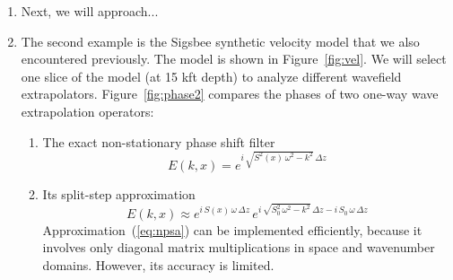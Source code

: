 \begin{enumerate}




\lstset{language=python,numbers=left,numberstyle=\tiny,showstringspaces=false}
{\small }

\item Next, we will approach...

\lstset{language=python,numbers=left,numberstyle=\tiny,showstringspaces=false}
{\small }

\lstset{language=c,numbers=left,numberstyle=\tiny,showstringspaces=false}
{\small }

\item The second example is the Sigsbee synthetic velocity model that
  we also encountered previously. The model is shown in
  Figure~\ref{fig:vel}. We will select one slice of the model (at 15
  kft depth) to analyze different wavefield
  extrapolators. Figure~\ref{fig:phase2} compares the phases of two one-way wave
  extrapolation operators:
  \begin{enumerate}
  \item The exact non-stationary phase shift filter
    \begin{equation}
      \label{eq:nps}
      E(k,x) = e^{i\,\sqrt{S^2(x)\,\omega^2 - k^2}\,\Delta z}
    \end{equation}
  \item Its split-step approximation
    \begin{equation}
      \label{eq:npsa}
      E(k,x) \approx e^{i\,S(x)\,\omega\,\Delta z}\,e^{i\,\sqrt{S_0^2\,\omega^2 - k^2}\,\Delta z-i\,S_0\,\omega\,\Delta z}
    \end{equation}
    Approximation~(\ref{eq:npsa}) can be implemented efficiently, because it involves
    only diagonal matrix multiplications in space and wavenumber domains. However, its accuracy is limited.
  \end{enumerate}   
  

\end{enumerate}
